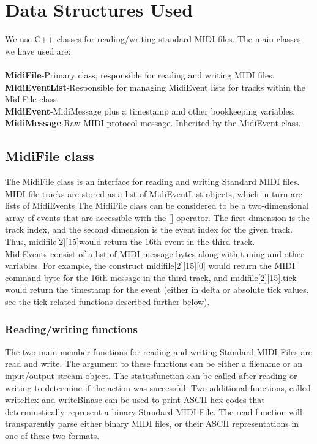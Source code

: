 \documentclass[12pt,a4paper]{article}
\begin{document}
\section{Data Structures Used}
We use C++ classes for reading/writing standard MIDI files. The main classes we have used are: \\ \\
\textbf{MidiFile}-Primary class, responsible for reading and writing MIDI files.\\
\textbf{MidiEventList}-Responsible for managing MidiEvent lists for tracks within the MidiFile class.\\
\textbf{MidiEvent}-MidiMessage plus a timestamp and other bookkeeping variables.\\
\textbf{MidiMessage}-Raw MIDI protocol message. Inherited by the MidiEvent class.\\


 \subsection{MidiFile class }
The MidiFile class is an interface for reading and writing Standard MIDI files. MIDI file tracks are stored as a list of MidiEventList objects, which in turn are lists of MidiEvents The MidiFile class can be considered to be a two-dimensional array of events that are accessible with the [] operator. The first dimension is the track index, and the second dimension is the event index for the given track. Thus, midifile[2][15]would return the 16th event in the third track.\\ 

MidiEvents consist of a list of MIDI message bytes along with timing and other variables. For example, the construct midifile[2][15][0] would return the MIDI command byte for the 16th message in the third track, and midifile[2][15].tick would return the timestamp for the event (either in delta or absolute tick values, see the tick-related functions described further below).\\

\subsubsection{ Reading/writing functions}

The two main member functions for reading and writing Standard MIDI Files are read and write. The argument to these functions can be either a filename or an input/output stream object. The statusfunction can be called after reading or writing to determine if the action was successful.
Two additional functions, called writeHex and writeBinasc can be used to print ASCII hex codes that determinstically represent a binary Standard MIDI File. The read function will transparently parse either binary MIDI files, or their ASCII representations in one of these two formats.\\
\end{document}

